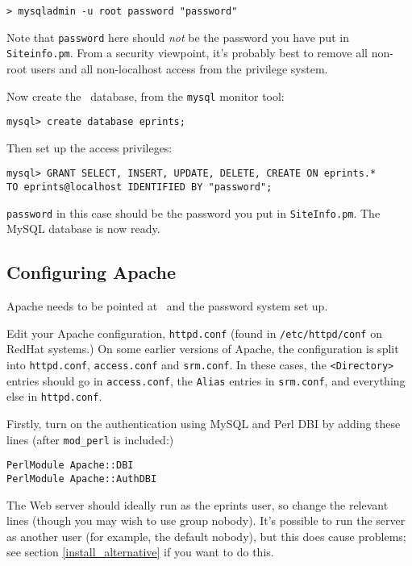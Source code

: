 \begin{verbatim}
> mysqladmin -u root password "password"
\end{verbatim}

Note that {\tt password} here should \emph{not} be the password you have put in {\tt Siteinfo.pm}. From a security viewpoint, it's probably best to remove all non-root users and all non-localhost access from the privilege system.

Now create the \eprints\ database, from the {\tt mysql} monitor tool:

\begin{verbatim}
mysql> create database eprints;
\end{verbatim}

Then set up the access privileges:

\begin{verbatim}
mysql> GRANT SELECT, INSERT, UPDATE, DELETE, CREATE ON eprints.*
TO eprints@localhost IDENTIFIED BY "password";
\end{verbatim}

{\tt password} in this case should be the password you put in {\tt SiteInfo.pm}. The MySQL database is now ready.


\subsection{Configuring Apache}

Apache needs to be pointed at \eprints\ and the password system set up.

Edit your Apache configuration, {\tt httpd.conf} (found in {\tt /etc/httpd/conf} on RedHat systems.) On some earlier versions of Apache, the configuration is split into {\tt httpd.conf}, {\tt access.conf} and {\tt srm.conf}.  In these cases, the {\tt <Directory>} entries should go in {\tt access.conf}, the {\tt Alias} entries in {\tt srm.conf}, and everything else in {\tt httpd.conf}.

Firstly, turn on the authentication using MySQL and Perl DBI by adding these lines (after {\tt mod\_perl} is included:)

\begin{verbatim}
PerlModule Apache::DBI
PerlModule Apache::AuthDBI
\end{verbatim}

The Web server should ideally run as the eprints user, so change the relevant lines (though you may wish to use group nobody). It's possible to run the server as another user (for example, the default nobody), but this does cause problems; see section \ref{install_alternative} if you want to do this.

